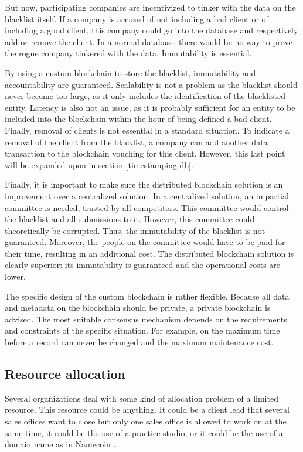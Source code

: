But now, participating companies are incentivized to tinker with the data on the blacklist itself. If a company is accused of not including a bad client or of including a good client, this company could go into the database and respectively add or remove the client. In a normal database, there would be no way to prove the rogue company tinkered with the data. Immutability is essential.

By using a custom blockchain to store the blacklist, immutability and accountability are guaranteed. Scalability is not a problem as the blacklist should never become too large, as it only includes the identification of the blacklisted entity. Latency is also not an issue, as it is probably sufficient for an entity to be included into the blockchain within the hour of being defined a bad client. Finally, removal of clients is not essential in a standard situation. To indicate a removal of the client from the blacklist, a company can add another data transaction to the blockchain vouching for this client. However, this last point will be expanded upon in section \ref{timestamping-db}.

Finally, it is important to make sure the distributed blockchain solution is an improvement over a centralized solution. In a centralized solution, an impartial committee is needed, trusted by all competitors. This committee would control the blacklist and all submissions to it. However, this committee could theoretically be corrupted. Thus, the immutability of the blacklist is not guaranteed. Moreover, the people on the committee would have to be paid for their time, resulting in an additional cost. The distributed blockchain solution is clearly superior: its immutability is guaranteed and the operational costs are lower.

The specific design of the custom blockchain is rather flexible. Because all data and metadata on the blockchain should be private, a private blockchain is advised. The most suitable consensus mechanism depends on the requirements and constraints of the specific situation. For example, on the maximum time before a record can never be changed and the maximum maintenance cost.

\subsection{Resource allocation}

Several organizations deal with some kind of allocation problem of a limited resource. This resource could be anything. It could be a client lead that several sales offices want to close but only one sales office is allowed to work on at the same time, it could be the use of a practice studio, or it could be the use of a domain name as in Namecoin \cite{namecoin-whitepaper}. 


